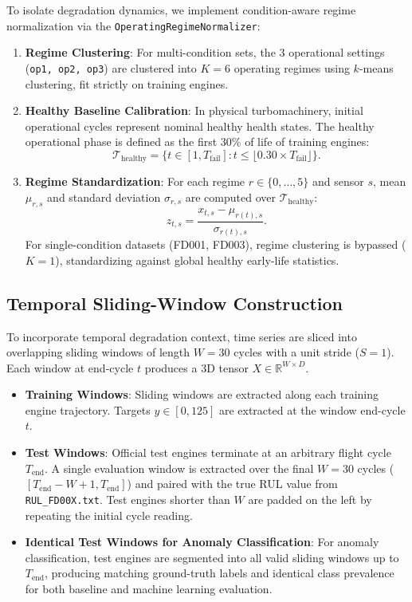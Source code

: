 To isolate degradation dynamics, we implement condition-aware regime normalization via the \texttt{OperatingRegimeNormalizer}:
\begin{enumerate}
    \item \textbf{Regime Clustering}: For multi-condition sets, the 3 operational settings (\texttt{op1, op2, op3}) are clustered into $K=6$ operating regimes using $k$-means clustering, fit strictly on training engines.
    \item \textbf{Healthy Baseline Calibration}: In physical turbomachinery, initial operational cycles represent nominal healthy health states. The healthy operational phase is defined as the first $30\%$ of life of training engines:
    $$\mathcal{T}_{\text{healthy}} = \{t \in [1, T_{\text{fail}}] : t \le \lfloor 0.30 \times T_{\text{fail}} \rfloor\}.$$
    \item \textbf{Regime Standardization}: For each regime $r \in \{0, \dots, 5\}$ and sensor $s$, mean $\mu_{r, s}$ and standard deviation $\sigma_{r, s}$ are computed over $\mathcal{T}_{\text{healthy}}$:
    $$z_{t, s} = \frac{x_{t, s} - \mu_{r(t), s}}{\sigma_{r(t), s}}.$$
    For single-condition datasets (FD001, FD003), regime clustering is bypassed ($K=1$), standardizing against global healthy early-life statistics.
\end{enumerate}

\subsection{Temporal Sliding-Window Construction}
To incorporate temporal degradation context, time series are sliced into overlapping sliding windows of length $W=30$ cycles with a unit stride ($S=1$). Each window at end-cycle $t$ produces a 3D tensor $X \in \mathbb{R}^{W \times D}$.
\begin{itemize}
    \item \textbf{Training Windows}: Sliding windows are extracted along each training engine trajectory. Targets $y \in [0, 125]$ are extracted at the window end-cycle $t$.
    \item \textbf{Test Windows}: Official test engines terminate at an arbitrary flight cycle $T_{\text{end}}$. A single evaluation window is extracted over the final $W=30$ cycles ($[T_{\text{end}} - W + 1, T_{\text{end}}]$) and paired with the true RUL value from \texttt{RUL\_FD00X.txt}. Test engines shorter than $W$ are padded on the left by repeating the initial cycle reading.
    \item \textbf{Identical Test Windows for Anomaly Classification}: For anomaly classification, test engines are segmented into all valid sliding windows up to $T_{\text{end}}$, producing matching ground-truth labels and identical class prevalence for both baseline and machine learning evaluation.
\end{itemize}

